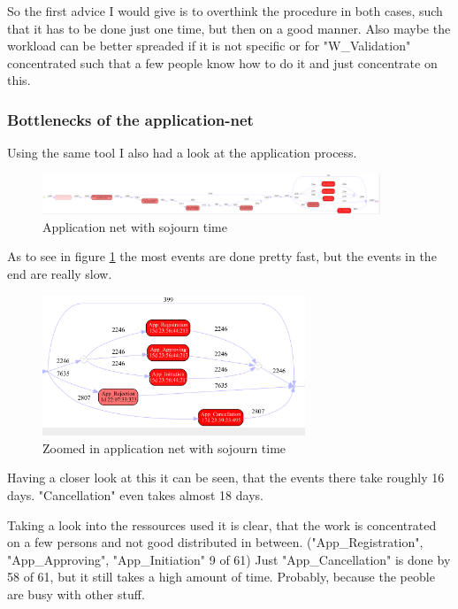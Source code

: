 So the first advice I would give is to overthink the procedure in both cases, such that it has to be done just one time, but then on a good manner. Also maybe the workload can be better spreaded if it is not specific or for "W\_Validation" concentrated such that a few people know how to do it and just concentrate on this.


\subsubsection{Bottlenecks of the application-net}
Using the same tool I also had a look at the application process.

\begin{figure}[!htbp]
\centering
\includegraphics[width = 0.9\textwidth]{AppSojuCom.PNG}
\caption{Application net with sojourn time}
\label{fig: AppSojuComp}
\end{figure}

As to see in figure \ref{fig: AppSojuComp} the most events are done pretty fast, but the events in the end are really slow. 

\begin{figure}[!htbp]
\centering
\includegraphics[width = 0.7\textwidth]{AppSojuProb.PNG}
\caption{Zoomed in application net with sojourn time}
\label{fig: AppSojuCompProb}
\end{figure}

Having a closer look at this it can be seen, that the events there take roughly 16 days. "Cancellation" even takes almost 18 days.

Taking a look into the ressources used it is clear, that the work is concentrated on a few persons and not good distributed in between. ("App\_Registration", "App\_Approving", "App\_Initiation" 9 of 61) Just "App\_Cancellation" is done by 58 of 61, but it still takes a high amount of time. Probably, because the peoble are busy with other stuff.

